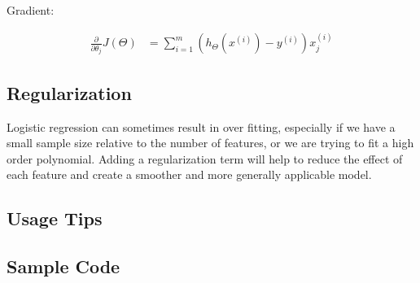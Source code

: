\documentclass{article}
\begin{document}
Gradient:

\begin{align}
\frac{\partial}{\partial \theta_j} J(\Theta) & = \sum_{i=1}^m (h_\Theta(x^{(i)}) - y^{(i)})x^{(i)}_j
\end{align}



\subsection{Regularization}

Logistic regression can sometimes result in over fitting, especially if we have a small sample size relative to the number of features, or we are trying to fit a high order polynomial. Adding a regularization term will help to reduce the effect of each feature and create a smoother and more generally applicable model. 

\subsection{Usage Tips}





\subsection{Sample Code}
\end{document}
